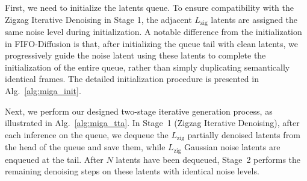 \documentclass{article}
\theoremstyle{plain}
\theoremstyle{definition}
\theoremstyle{remark}
\begin{document}
First, we need to initialize the latents queue. To ensure compatibility with the Zigzag Iterative Denoising in Stage 1, the adjacent $L_{\mathrm{zig}}$ latents are assigned the same noise level during initialization.  
A notable difference from the initialization in FIFO-Diffusion is that, after initializing the queue tail with clean latents, we progressively guide the noise latent using these latents to complete the initialization of the entire queue, rather than simply duplicating semantically identical frames.
The detailed initialization procedure is presented in Alg.~\ref{alg:miga_init}.


Next, we perform our designed two-stage iterative generation process, as illustrated in Alg.~\ref{alg:miga_tta}. In Stage~1 (Zigzag Iterative Denoising), after each inference on the queue, we dequeue the $L_{\mathrm{zig}}$ partially denoised latents from the head of the queue and save them, while $L_{\mathrm{zig}}$ Gaussian noise latents are enqueued at the tail.  
After $N$ latents have been dequeued, Stage~2 performs the remaining denoising steps on these latents with identical noise levels.
\end{document}
